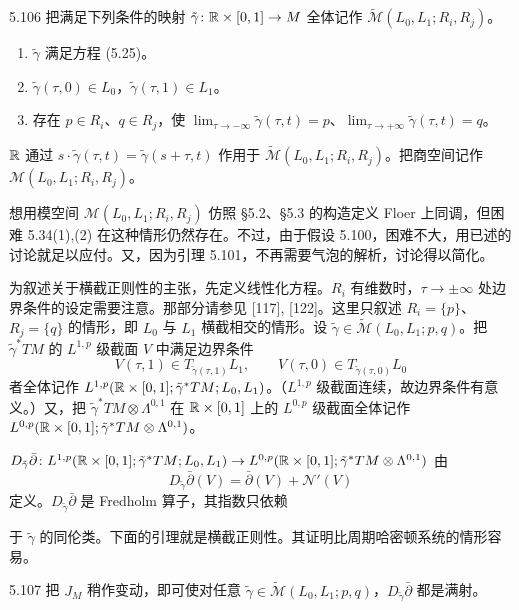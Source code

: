 \begin{definition}{5.106}
  把满足下列条件的映射 $\tilde\gamma\colon\mathbb{R}\times[0,1]\to M$ 全体记作 $\tilde{\mathcal{M}}(L_0,L_1;R_i,R_j)$。
  \begin{enumerate}[label=(\arabic*),leftmargin=2.4em,itemsep=1pt,topsep=2pt]
    \item $\tilde\gamma$ 满足方程 (5.25)。
    \item $\tilde\gamma(\tau,0)\in L_0$，$\tilde\gamma(\tau,1)\in L_1$。
    \item 存在 $p\in R_i$、$q\in R_j$，使 $\lim_{\tau\to-\infty}\tilde\gamma(\tau,t)=p$、$\lim_{\tau\to+\infty}\tilde\gamma(\tau,t)=q$。
  \end{enumerate}
  $\mathbb{R}$ 通过 $s\cdot\tilde\gamma(\tau,t)=\tilde\gamma(s+\tau,t)$ 作用于 $\tilde{\mathcal{M}}(L_0,L_1;R_i,R_j)$。把商空间记作 $\mathcal{M}(L_0,L_1;R_i,R_j)$。
\end{definition}

想用模空间 $\mathcal{M}(L_0,L_1;R_i,R_j)$ 仿照 §5.2、§5.3 的构造定义 Floer 上同调，但困难 5.34(1),(2) 在这种情形仍然存在。不过，由于假设 5.100，困难不大，用已述的讨论就足以应付。又，因为引理 5.101，不再需要气泡的解析，讨论得以简化。

为叙述关于横截正则性的主张，先定义线性化方程。$R_i$ 有维数时，$\tau\to\pm\infty$ 处边界条件的设定需要注意。那部分请参见 [117], [122]。这里只叙述 $R_i=\{p\}$、$R_j=\{q\}$ 的情形，即 $L_0$ 与 $L_1$ 横截相交的情形。设 $\tilde\gamma\in\tilde{\mathcal{M}}(L_0,L_1;p,q)$。把 $\tilde\gamma^*TM$ 的 $L^{1,p}$ 级截面 $V$ 中满足边界条件
\[
V(\tau,1)\in T_{\tilde\gamma(\tau,1)}L_1,\qquad V(\tau,0)\in T_{\tilde\gamma(\tau,0)}L_0
\]
者全体记作 $L^{1,p}(\mathbb{R}\times[0,1];\tilde\gamma^*TM;L_0,L_1)$。（$L^{1,p}$ 级截面连续，故边界条件有意义。）又，把 $\tilde\gamma^*TM\otimes\Lambda^{0,1}$ 在 $\mathbb{R}\times[0,1]$ 上的 $L^{0,p}$ 级截面全体记作 $L^{0,p}(\mathbb{R}\times[0,1];\tilde\gamma^*TM\otimes\Lambda^{0,1})$。

$D_{\tilde\gamma}\bar\partial\colon L^{1,p}(\mathbb{R}\times[0,1];\tilde\gamma^*TM;L_0,L_1)\to L^{0,p}(\mathbb{R}\times[0,1];\tilde\gamma^*TM\otimes\Lambda^{0,1})$ 由
\[
D_{\tilde\gamma}\bar\partial(V)=\bar\partial(V)+\mathcal{N}'(V)
\]
定义。$D_{\tilde\gamma}\bar\partial$ 是 Fredholm 算子，其指数只依赖

于 $\tilde\gamma$ 的同伦类。下面的引理就是横截正则性。其证明比周期哈密顿系统的情形容易。

\begin{lemma}{5.107}
  把 $J_M$ 稍作变动，即可使对任意 $\tilde\gamma\in\tilde{\mathcal{M}}(L_0,L_1;p,q)$，$D_{\tilde\gamma}\bar\partial$ 都是满射。
\end{lemma}

